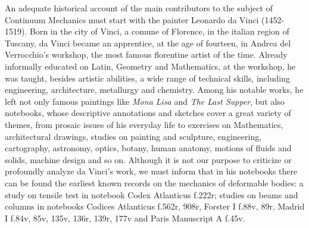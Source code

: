 An adequate historical account of the main contributors to the subject of Continuum Mechanics must start with the painter Leonardo da Vinci (1452-1519). Born in the city of Vinci, a comune of Florence, in the italian region of Tuscany, da Vinci became an apprentice, at the age of fourteen, in Andrea del Verrocchio's workshop, the most famous florentine artist of the time. Already informally educated on Latin, Geometry and Mathematics, at the workshop, he was taught, besides artistic abilities, a wide range of technical skills, including engineering, architecture, metallurgy and chemistry. Among his notable works, he left not only famous paintings like \emph{Mona Lisa} and \emph{The Last Supper}, but also notebooks, whose descriptive annotations and sketches cover a great variety of themes, from prosaic issues of his everyday life to exercises on Mathematics, architectural drawings, studies on painting and sculpture, engineering, cartography, astronomy, optics, botany, human anatomy, motions of fluids and solids, machine design and so on. Although it is not our purpose to criticize or profoundly analyze da Vinci's work, we must inform that in his notebooks there can be found the earliest known records on the mechanics of deformable bodies: a study on tensile test in notebook Codex Atlanticus f.222r; studies on beams and columns in notebooks Codices Atlanticus f.562r, 908r, Forster I  f.88v, 89r, Madrid I f.84v, 85v, 135v, 136r, 139r, 177v and Paris Manuscript A f.45v. 
\begin{figure}[!ht]
	\centering
	\begin{center}
	\end{center}
	\label{fg:Madrid84vAtl908r}
\end{figure}
